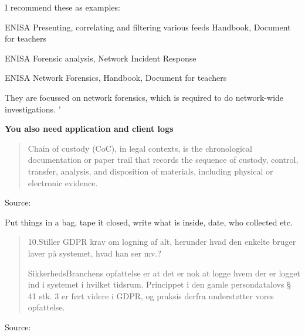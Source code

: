 \documentclass[Screen16to9,17pt]{foils}
\begin{document}
\begin{list2}
\item I recommend these as examples:
\item ENISA Presenting, correlating and filtering various feeds Handbook, Document for teachers\\ 
\item ENISA Forensic analysis, Network Incident Response\\ 
\item ENISA Network Forensics, Handbook, Document for teachers\\ 
\end{list2}

They are focussed on network forensics, which is required to do network-wide investigations. '

{\bf You also need application and client logs}




\begin{quote}
Chain of custody (CoC), in legal contexts, is the chronological documentation or paper trail that records the sequence of custody, control, transfer, analysis, and disposition of materials, including physical or electronic evidence.
\end{quote}
Source: 

\begin{list2}
\item Put things in a bag, tape it closed, write what is inside, date, who collected etc.
\end{list2}




\begin{quote}
  10.Stiller GDPR krav om logning af alt, herunder hvad den enkelte bruger laver på
  systemet, hvad han ser mv.?

  SikkerhedsBranchens opfattelse er at det er nok at logge hvem der er logget ind i
  systemet i hvilket tidsrum. Princippet i den gamle persondatalovs § 41 stk. 3 er
  ført videre i GDPR, og praksis derfra understøtter vores opfattelse.
\end{quote}
Source: \\{\footnotesize
{}}
\end{document}
